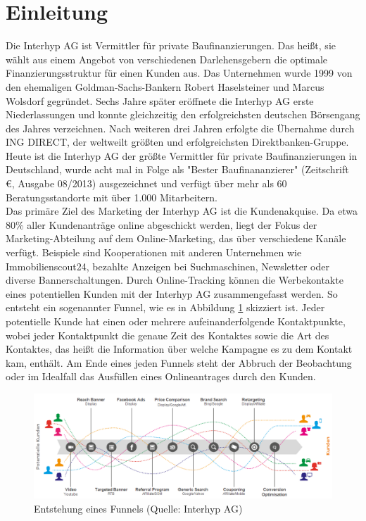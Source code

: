 \section{Einleitung}

Die Interhyp AG ist Vermittler für private Baufinanzierungen. Das heißt, sie wählt aus einem Angebot von verschiedenen Darlehensgebern die optimale Finanzierungsstruktur für einen Kunden aus. Das Unternehmen wurde 1999 von den ehemaligen Goldman-Sachs-Bankern Robert Haselsteiner und Marcus Wolsdorf gegründet. Sechs Jahre später eröffnete die Interhyp AG erste Niederlassungen und konnte gleichzeitig den erfolgreichsten deutschen Börsengang des Jahres verzeichnen. Nach weiteren drei Jahren erfolgte die Übernahme durch ING DIRECT, der weltweilt größten und erfolgreichsten Direktbanken-Gruppe. Heute ist die Interhyp AG der größte Vermittler für private Baufinanzierungen in Deutschland, wurde acht mal in Folge als "Bester Baufinananzierer" (Zeitschrift \euro, Ausgabe 08/2013) ausgezeichnet und verfügt über mehr als 60 Beratungsstandorte mit über 1.000 Mitarbeitern.\\
Das primäre Ziel des Marketing der Interhyp AG ist die Kundenakquise. Da etwa 80\% aller Kundenanträge online abgeschickt werden, liegt der Fokus der Marketing-Abteilung auf dem Online-Marketing, das über verschiedene Kanäle verfügt. Beispiele sind Kooperationen mit anderen Unternehmen wie Immobilienscout24, bezahlte Anzeigen bei Suchmaschinen, Newsletter oder diverse Bannerschaltungen. Durch Online-Tracking können die Werbekontakte eines potentiellen Kunden mit der Interhyp AG zusammengefasst werden. So entsteht ein sogenannter Funnel, wie es in Abbildung \ref{customerJourney} skizziert ist. Jeder potentielle Kunde hat einen oder mehrere aufeinanderfolgende Kontaktpunkte, wobei jeder Kontaktpunkt die genaue Zeit des Kontaktes sowie die Art des Kontaktes, das heißt die Information über welche Kampagne es zu dem Kontakt kam, enthält. Am Ende eines jeden Funnels steht der Abbruch der Beobachtung oder im Idealfall das Ausfüllen eines Onlineantrages durch den Kunden.
\begin{figure}[H]
    \centering\includegraphics[scale=0.5]{customerJourney.png}\caption{Entstehung eines Funnels (Quelle: Interhyp AG)}\label{customerJourney}
\end{figure}
